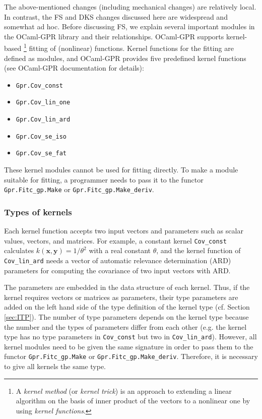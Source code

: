 \documentclass[10pt,a4paper]{article}
\begin{document}
The above-mentioned changes (including mechanical changes) are relatively local.
In contrast, the FS and DKS changes discussed here are widespread and somewhat ad hoc.
Before discussing FS, we explain several important modules in the OCaml-GPR library
and their relationships. OCaml-GPR supports kernel-based%
\footnote{A \emph{kernel method} (or \emph{kernel trick}) is an approach to extending
a linear algorithm on the basis of inner product of the vectors to a nonlinear one by using
\emph{kernel functions}.}
fitting of (nonlinear) functions.
Kernel functions for the fitting are defined as modules, and OCaml-GPR
provides five predefined kernel functions (see OCaml-GPR documentation
for details):
\begin{itemize}
\item \lstinline|Gpr.Cov_const|
\item \lstinline|Gpr.Cov_lin_one|
\item \lstinline|Gpr.Cov_lin_ard|
\item \lstinline|Gpr.Cov_se_iso|
\item \lstinline|Gpr.Cov_se_fat|
\end{itemize}
These kernel modules cannot be used for fitting directly.
To make a module suitable for fitting, a programmer needs to pass it to the functor
\lstinline|Gpr.Fitc_gp.Make| or \lstinline|Gpr.Fitc_gp.Make_deriv|.

\subsubsection{Types of kernels}

Each kernel function accepts two input vectors and parameters such as scalar
values, vectors, and matrices.
For example, a constant kernel \lstinline|Cov_const| calculates
$k(\bm{x}, \bm{y}) = 1 / \theta^2$ with a real constant $\theta$,
and the kernel function of \lstinline|Cov_lin_ard| needs a vector of
automatic relevance determination (ARD) parameters for computing
the covariance of two input vectors with ARD.

The parameters are embedded in the data structure of each kernel.
Thus, if the kernel requires vectors or matrices as parameters,
their type parameters are added on the left hand side of the type definition
of the kernel type (cf. Section \ref{sec:ITP}).
The number of type parameters depends on the kernel type because
the number and the types of parameters differ from each other
(e.g. the kernel type has no type parameters in \lstinline|Cov_const|
but two in \lstinline|Cov_lin_ard|). However,
all kernel modules need to be given the same signature in order to pass them to
the functor \lstinline|Gpr.Fitc_gp.Make| or \lstinline|Gpr.Fitc_gp.Make_deriv|.
Therefore, it is necessary to give all kernels the same type.
\end{document}
